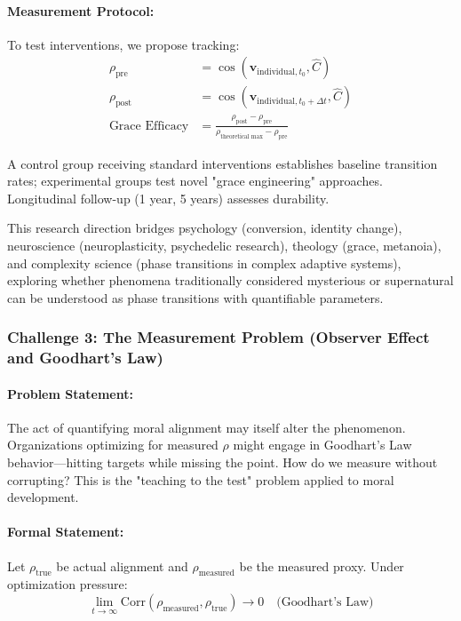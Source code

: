 \documentclass[11pt,a4paper]{article}
\theoremstyle{definition}
\theoremstyle{remark}
\begin{document}
\begin{small}
\paragraph{Measurement Protocol:}
To test interventions, we propose tracking:
\begin{align}
    \rho_{\text{pre}} &= \cos(\mathbf{v}_{\text{individual}, t_0}, \hat{C}) \\
    \rho_{\text{post}} &= \cos(\mathbf{v}_{\text{individual}, t_0 + \Delta t}, \hat{C}) \\
    \text{Grace Efficacy} &= \frac{\rho_{\text{post}} - \rho_{\text{pre}}}{\rho_{\text{theoretical max}} - \rho_{\text{pre}}}
\end{align}

A control group receiving standard interventions establishes baseline transition rates; experimental groups test novel "grace engineering" approaches. Longitudinal follow-up (1 year, 5 years) assesses durability.

This research direction bridges psychology (conversion, identity change), neuroscience (neuroplasticity, psychedelic research), theology (grace, metanoia), and complexity science (phase transitions in complex adaptive systems), exploring whether phenomena traditionally considered mysterious or supernatural can be understood as phase transitions with quantifiable parameters.

\subsubsection{Challenge 3: The Measurement Problem (Observer Effect and Goodhart's Law)}

\paragraph{Problem Statement:} 
The act of quantifying moral alignment may itself alter the phenomenon. Organizations optimizing for measured \(\rho\) might engage in Goodhart's Law behavior—hitting targets while missing the point. How do we measure without corrupting? This is the "teaching to the test" problem applied to moral development.

\paragraph{Formal Statement:} 
Let \(\rho_{\text{true}}\) be actual alignment and \(\rho_{\text{measured}}\) be the measured proxy. Under optimization pressure:
\begin{equation}
\lim_{t \to \infty} \text{Corr}(\rho_{\text{measured}}, \rho_{\text{true}}) \to 0 \quad \text{(Goodhart's Law)}
\end{equation}


\end{small}
\end{document}
